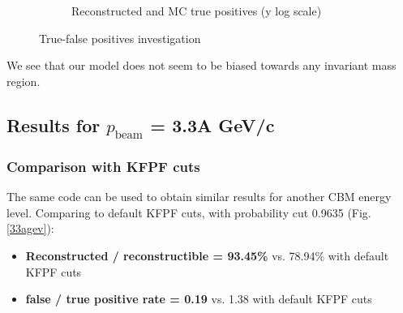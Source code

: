 \begin{figure}[h!]
\begin{subfigure}[b]{0.69\linewidth}
        \caption{Reconstructed and MC true positives (y log scale)}
        \vspace{0.3cm}
    \end{subfigure}
    \caption{True-false positives investigation}
    \label{true-false}
\end{figure}
We see that our model does not seem to be biased towards any invariant mass region.

\newpage
\subsection{Results for $p_{\text{beam}}$ = 3.3A GeV/c}

\subsubsection{Comparison with KFPF cuts}
The same code can be used to obtain similar results for another CBM energy level. Comparing to default KFPF cuts, with probability cut 0.9635 (Fig. \ref{33agev}):
\begin{itemize}
    \item \textbf{Reconstructed \PKshort / reconstructible \PKshort = 93.45\%}  vs. 78.94\% with default KFPF cuts
    \item \textbf{false / true positive rate = 0.19} vs. 1.38 with default KFPF cuts
\end{itemize}

